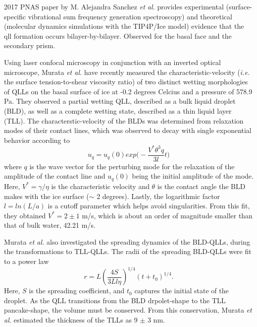 2017 PNAS paper by M. Alejandra Sanchez \textit{et al.} provides
experimental (surface-specific vibrational sum frequency generation
spectroscopy)  and theoretical (molecular dynamics simulations with
the TIP4P/Ice model)
evidence that the qll formation occurs
bilayer-by-bilayer. Observed for the basal face and the secondary prism. 

Using laser confocal microscopy in conjunction with an inverted
optical microscope, Murata \textit{et al.} have recently measured the
characteristic-velocity (\textit{i.e.} the surface tension-to-shear
viscosity ratio) of two distinct wetting morphologies of QLLs on the
basal surface of ice at -0.2 degrees Celcius and a pressure of 578.9
Pa.\cite{Murata2015} They observed a partial wetting QLL, described as
a bulk liquid droplet (BLD), as well as a complete wetting state,
described as a thin liquid layer (TLL). The characterstic-velocity of
the BLDs was determined from relaxation modes of their contact lines,
which was observed to decay with single exponential behavior according
to
\begin{equation}
u_q = u_q(0) exp\Bigg(-\frac{V^* \theta^3 q}{3l}t\Bigg)
\end{equation}
where $q$ is the wave vector for the perturbing mode for the
relaxation of the amplitude of the contact line and $u_q(0)$ being the
initial amplitude of the mode. Here, $V^* = \gamma / \eta$ is the
characteristic velocity and $\theta$ is the contact angle the BLD makes
with the ice surface ($\sim$ 2 degrees). Lastly, the logarithmic factor
$l=ln(L/a)$ is a cutoff parameter which helps avoid
singularities. From this fit, they obtained $V^* = 2 \pm 1$ m/s, which
is about an order of magnitude smaller than that of bulk water, 42.21
m/s.

Murata \textit{et al.} also investigated the spreading dynamics of the
BLD-QLLs, during the transformations to TLL-QLLs. The radii of the
spreading BLD-QLLs were fit to a power law
\begin{equation}
r = L (\frac{4S}{3Ll \eta})^{1/4}(t+t_0)^{1/4}.
\end{equation}
Here, $S$ is the spreading coefficient, and $t_0$ captures the initial
state of the droplet. As the QLL transitions from the BLD
drpolet-shape to the TLL pancake-shape, the volume must be
conserved. From this conservation, Murata \textit{et al.} estimated
the thickness of the TLLs as 9 $\pm$ 3 nm.

